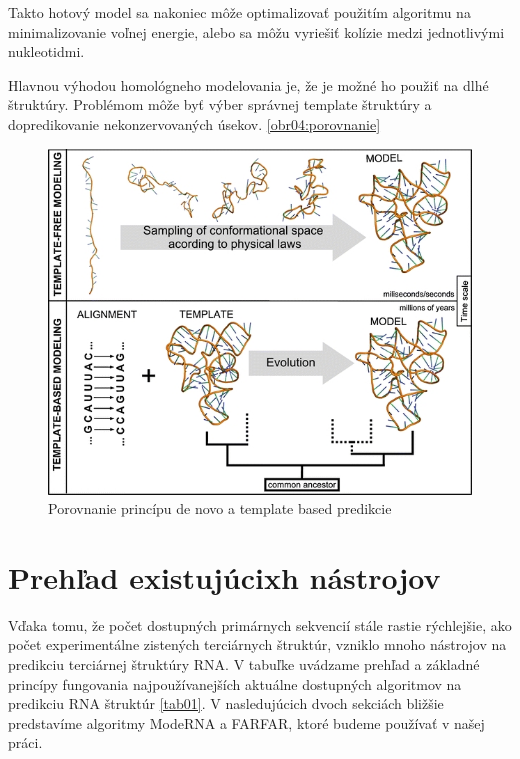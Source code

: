 \indent Takto hotový model sa nakoniec môže optimalizovať použitím algoritmu na minimalizovanie voľnej energie, alebo sa môžu vyriešiť kolízie medzi jednotlivými nukleotidmi.


\indent Hlavnou výhodou homológneho modelovania je, že je možné ho použiť na dlhé štruktúry. Problémom môže byť výber správnej template štruktúry a dopredikovanie nekonzervovaných úsekov. \autoref{obr04:porovnanie}


\begin{figure}%
\includegraphics[width=\textwidth]{../img/template-vs-denovo}
\caption{Porovnanie princípu de novo a template based predikcie \cite{Rother11}}
\label{obr04:porovnanie}
\end{figure}


\section{Prehľad existujúcixh nástrojov}
Vďaka tomu, že počet dostupných primárnych sekvencií stále rastie rýchlejšie, ako počet experimentálne zistených terciárnych štruktúr, vzniklo mnoho nástrojov na predikciu terciárnej štruktúry RNA. V tabuľke uvádzame prehľad a základné princípy fungovania najpoužívanejších aktuálne dostupných algoritmov na predikciu RNA štruktúr \autoref{tab01}. V nasledujúcich dvoch sekciách bližšie predstavíme algoritmy ModeRNA a FARFAR, ktoré budeme používať v našej práci.


